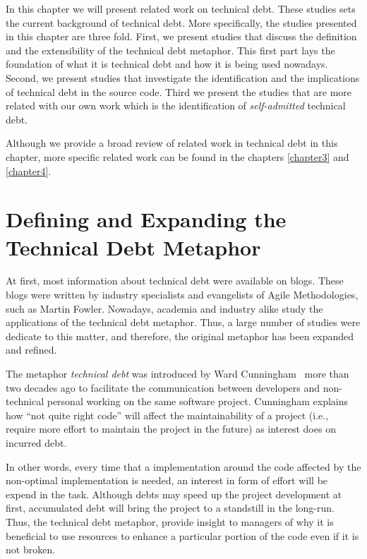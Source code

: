 
In this chapter we will present related work on technical debt. These studies sets the current background of technical debt. More specifically, the studies presented in this chapter are three fold. First, we present studies that discuss the definition and the extensibility of the technical debt metaphor. This first part lays the foundation of what it is technical debt and how it is being used nowadays. Second, we present studies that investigate the identification and the implications of technical debt in the source code. Third we present the studies that are more related with our own work which is the identification of \emph{self-admitted} technical debt. 

Although we provide a broad review of related work in technical debt in this chapter, more specific related work can be found in the chapters \ref{chapter3} and \ref{chapter4}.

\section{Defining and Expanding the Technical Debt Metaphor}
\label{defining_and_extending_technical_debt}

At first, most information about technical debt were available on blogs. These blogs were written by industry specialists and evangelists of Agile Methodologies, such as Martin Fowler. Nowadays, academia and industry alike study the applications of the technical debt metaphor. Thus, a large number of studies were dedicate to this matter, and therefore, the original metaphor has been expanded and refined.

The metaphor \textit{technical debt} was introduced by Ward Cunningham~\cite{Cunningham1992WPM} more than two decades ago to facilitate the communication between developers and non-technical personal working on the same software project. Cunningham explains how ``not quite right code'' will affect the maintainability of a project (i.e., require more effort to maintain the project in the future) as interest does on incurred debt. 

In other words, every time that a implementation around the code affected by the non-optimal implementation is needed, an interest in form of effort will be expend in the task. Although debts may speed up the project development at first, accumulated debt will bring the project to a standstill in the long-run. Thus, the technical debt metaphor, provide insight to managers of why it is beneficial to use resources to enhance a particular portion of the code even if it is not broken.

